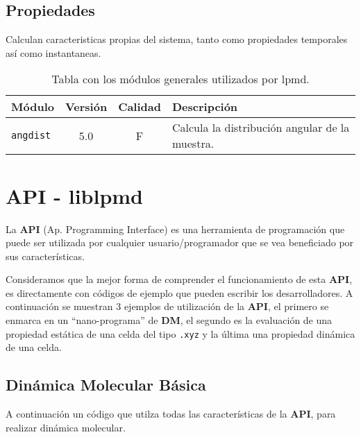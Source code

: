\section{Propiedades}
Calculan caracteristicas propias del sistema, tanto como propiedades temporales as\'i como instantaneas.

\begin{table}[h!]
 \begin{tabular}{|l|c|c|p{10cm}|}\hline
 M\'odulo & Versi\'on & Calidad & Descripci\'on \\
 \hline
 \texttt{angdist} & 5.0 & F & Calcula la distribuci\'on angular de la muestra.\\
 \hline
 \end{tabular}
\label{tab:modproper}
\caption{Tabla con los m\'odulos generales utilizados por lpmd.}
\end{table}

\chapter{API - liblpmd}
\label{ap:API}
La \textbf{API} (Ap. Programming Interface) es una herramienta de programaci\'on que puede ser utilizada por cualquier usuario/programador que se vea beneficiado por sus caracter\'isticas.

Consideramos que la mejor forma de comprender el funcionamiento de esta \textbf{API}, es directamente con c\'odigos de ejemplo que pueden escribir los desarrolladores. A continuaci\'on se muestran 3 ejemplos de utilizaci\'on de la \textbf{API}, el primero se enmarca en un ``nano-programa'' de \textbf{DM}, el segundo es la evaluaci\'on de una propiedad est\'atica de una celda del tipo \texttt{.xyz} y la \'ultima una propiedad din\'amica de una celda.

\section{Din\'amica Molecular B\'asica}

A continuaci\'on un c\'odigo que utilza todas las caracter\'isticas de la \textbf{API}, para realizar din\'amica molecular.

